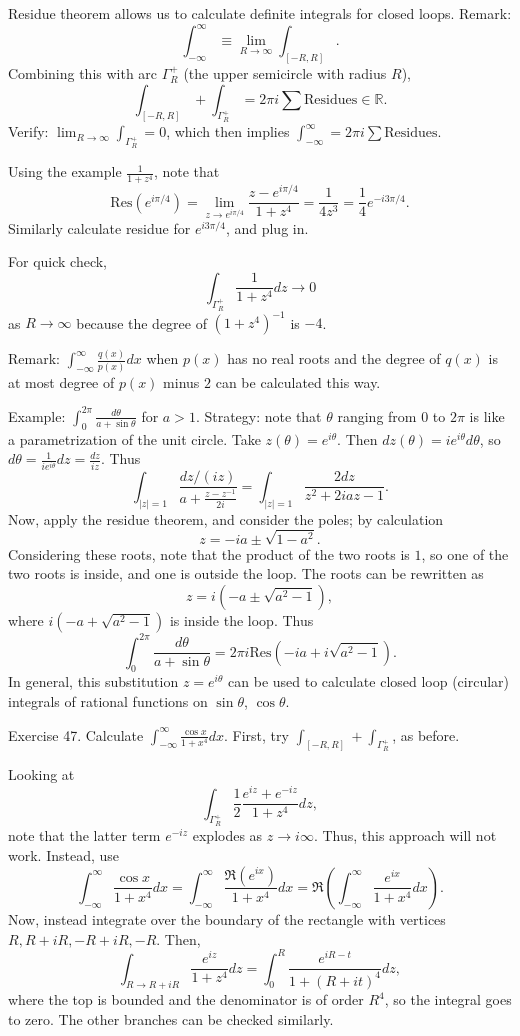 \documentclass{artikel3}
\date{\formatdate{2012}{05}{02}}
\newcommand{\pr}[1]{\left(#1\right)}
\newcommand{\abs}[1]{\left|#1\right|}
\newcommand{\complex}{\mathbb{R}}
\numberwithin{equation}{enumi}
\begin{document}
Residue theorem allows us to calculate definite integrals for closed loops.
Remark: \[
	\int_{-\infty}^{\infty}\equiv \lim_{R\to\infty}\int_{[-R,R]}.
\] Combining this with arc $\Gamma_R^+$ (the upper semicircle
with radius $R$), \[
	\int_{[-R,R]}+\int_{\Gamma_R^+}=2\pi i\sum\mathrm{Residues}\in\complex.
\] Verify: $\lim_{R\to\infty}\int_{\Gamma_R^+}=0$, which
then implies $\int_{-\infty}^\infty = 2\pi i\sum\mathrm{Residues}$.

Using the example $\frac{1}{1+z^4}$, note that \[
	\mathrm{Res}(e^{i\pi/4})=\lim_{z\to e^{i\pi/4}}\frac{z-e^{i\pi/4}}{1+z^4}=\frac{1}{4z^3}=\frac{1}{4}e^{-i3\pi/4}.
\] Similarly calculate residue for $e^{i3\pi/4}$, and plug in.

For quick check, \[
	\int_{\Gamma_R^+}\frac{1}{1+z^4}dz\to 0
\] as $R\to\infty$ because the degree of $(1+z^4)^{-1}$ is $-4$.

Remark: $\int_{-\infty}^\infty \frac{q(x)}{p(x)}dx$ when $p(x)$ has no
real roots and the degree of $q(x)$ is at most degree of $p(x)$ minus $2$
can be calculated this way.

Example: $\int_0^{2\pi} \frac{d\theta}{a+\sin\theta}$ for $a>1$.
Strategy: note that $\theta$ ranging from $0$ to $2\pi$ is like
a parametrization of the unit circle.  Take $z(\theta)=e^{i\theta}$.
Then $dz(\theta)=ie^{i\theta}d\theta$, so $d\theta=\frac{1}{ie^{i\theta}}dz=\frac{dz}{iz}$.
Thus \[
	\int_{\abs{z}=1}\frac{dz/(iz)}{a+\frac{z-z^{-1}}{2i}}
	=\int_{\abs{z}=1}\frac{2dz}{z^2+2iaz-1}.
\] Now, apply the residue theorem, and consider the poles;
by calculation \[
	z=-ia\pm\sqrt{1-a^2}.
\] Considering these roots, note that the product of the two roots
is $1$, so one of the two roots is inside, and one is outside
the loop.  The roots can be rewritten as \[
	z=i(-a\pm\sqrt{a^2-1}),
\] where $i(-a+\sqrt{a^2-1})$ is inside the loop.
Thus \[
	\int_0^{2\pi} \frac{d\theta}{a+\sin\theta}=2\pi i\mathrm{Res}(-ia+i\sqrt{a^2-1}).
\] In general, this substitution $z=e^{i\theta}$ can be used to calculate closed
loop (circular) integrals of rational functions on $\sin\theta$, $\cos\theta$.

Exercise 47.  Calculate $\int_{-\infty}^{\infty}\frac{\cos x}{1+x^4}dx$.
First, try $\int_{[-R,R]}+\int_{\Gamma_R^+}$, as before.

Looking at \[
	\int_{\Gamma_R^+}\frac{1}{2}\frac{e^{iz}+e^{-iz}}{1+z^4}dz,
\] note that the latter term $e^{-iz}$ explodes as $z\to i\infty$.
Thus, this approach will not work.  Instead, use \[
	\int_{-\infty}^\infty \frac{\cos x}{1+x^4}dx
	=\int_{-\infty}^\infty \frac{\Re(e^{ix})}{1+x^4}dx
	=\Re\pr{\int_{-\infty}^\infty \frac{e^{ix}}{1+x^4}dx}.
\] Now, instead integrate over the boundary of the rectangle
with vertices $R,R+iR,-R+iR,-R$.  Then, \[
	\int_{R\to R+iR}\frac{e^{iz}}{1+z^4}dz=
	\int_{0}^{R}\frac{e^{iR-t}}{1+(R+it)^4}dz,
\] where the top is bounded and the denominator is of order $R^4$,
so the integral goes to zero.  The other branches
can be checked similarly.
\end{document}
